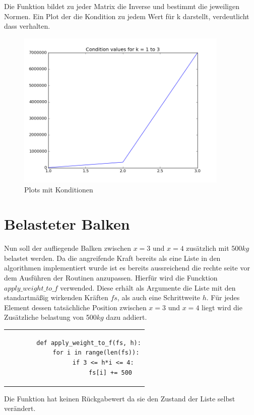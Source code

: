 \documentclass[12pt,titlepage]{article}
\begin{document}
				\newline \newline
				Die Funktion bildet zu jeder Matrix die Inverse und bestimmt die jeweiligen Normen.
				\newpage
				Ein Plot der die Kondition zu jedem Wert für k darstellt, verdeutlicht dass verhalten.
				\begin{figure}[H] 
					 \centering
					 \includegraphics[width=0.9\textwidth]{conds.png}
					 \caption{Plots mit Konditionen}
					 \label{fig:Bild4}
				\end{figure}
				
\section{Belasteter Balken}

	Nun soll der aufliegende Balken zwischen $x=3$ und $x=4$ zusätzlich mit 500$kg$ belastet werden.
	Da die angreifende Kraft bereits als eine Liste in den algorithmen implementiert wurde ist es bereits aussreichend die rechte seite vor
	dem Ausführen der Routinen anzupassen. Hierfür wird die Funcktion $apply\_weight\_to\_f$ verwended. Diese erhält als Argumente die Liste mit
	den standartmäßig wirkenden Kräften $fs$, als auch eine Schrittweite $h$. Für jedes Element dessen tatsächliche Position zwischen $x=3$ und $x=4$ liegt
	wird die Zusätzliche belastung von 500$kg$ dazu addiert. \newline \newline
	\begin{tabular}{c}
	\begin{lstlisting}
		def apply_weight_to_f(fs, h):
    		for i in range(len(fs)):
        		if 3 <= h*i <= 4:
            		fs[i] += 500
	\end{lstlisting}
	\end{tabular}
	\newline \newline
	Die Funktion hat keinen Rückgabewert da sie den Zustand der Liste selbst verändert.	
	
\end{document}
